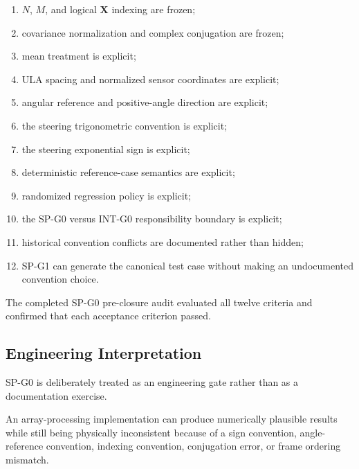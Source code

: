 \begin{enumerate}
    \item \(N\), \(M\), and logical \(\mathbf X\) indexing are frozen;

    \item covariance normalization and complex conjugation are frozen;

    \item mean treatment is explicit;

    \item ULA spacing and normalized sensor coordinates are explicit;

    \item angular reference and positive-angle direction are explicit;

    \item the steering trigonometric convention is explicit;

    \item the steering exponential sign is explicit;

    \item deterministic reference-case semantics are explicit;

    \item randomized regression policy is explicit;

    \item the SP-G0 versus INT-G0 responsibility boundary is explicit;

    \item historical convention conflicts are documented rather than hidden;

    \item SP-G1 can generate the canonical test case without making an
    undocumented convention choice.
\end{enumerate}

The completed SP-G0 pre-closure audit evaluated all twelve criteria and
confirmed that each acceptance criterion passed.

\subsection{Engineering Interpretation}

SP-G0 is deliberately treated as an engineering gate rather than as a
documentation exercise.

An array-processing implementation can produce numerically plausible results
while still being physically inconsistent because of a sign convention,
angle-reference convention, indexing convention, conjugation error, or frame
ordering mismatch.

